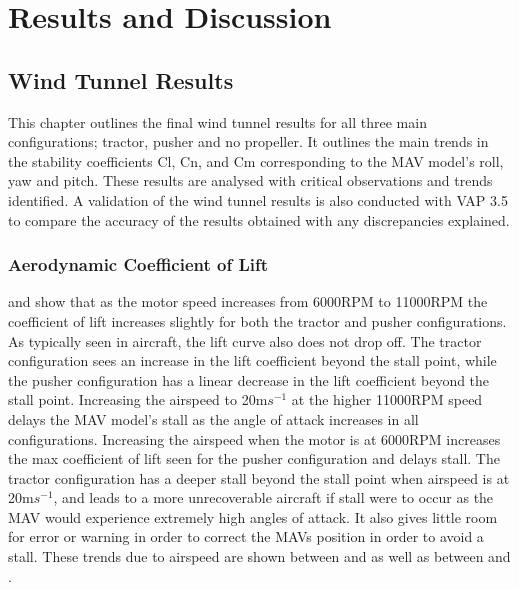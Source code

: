\graphicspath{{./Figs/}}

\chapter{Results and Discussion} 

\section{Wind Tunnel Results}
This chapter outlines the final wind tunnel results for all three main configurations; tractor, pusher and no propeller. It outlines the main trends in the stability coefficients Cl, Cn, and Cm corresponding to the MAV model's roll, yaw and pitch. These results are analysed with critical observations and trends identified. A validation of the wind tunnel results is also conducted with VAP 3.5 to compare the accuracy of the results obtained with any discrepancies explained.



\subsection{Aerodynamic Coefficient of Lift}
 and  show that as the motor speed increases from 6000RPM to 11000RPM the coefficient of lift increases slightly for both the tractor and pusher configurations. As typically seen in aircraft, the lift curve also does not drop off. The tractor configuration sees an increase in the lift coefficient beyond the stall point, while the pusher configuration has a linear decrease in the lift coefficient beyond the stall point. Increasing the airspeed to 20m$s^{-1}$ at the higher 11000RPM speed delays the MAV model's stall as the angle of attack increases in all configurations. Increasing the airspeed when the motor is at 6000RPM increases the max coefficient of lift seen for the pusher configuration  and delays stall. The tractor configuration has a deeper stall beyond the stall point when airspeed is at 20m$s^{-1}$, and leads to a more unrecoverable aircraft if stall were to occur as the MAV would experience extremely high angles of attack. It also gives little room for error or warning in order to correct the MAVs position in order to avoid a stall. These trends due to airspeed are shown between  and  as well as between  and .

